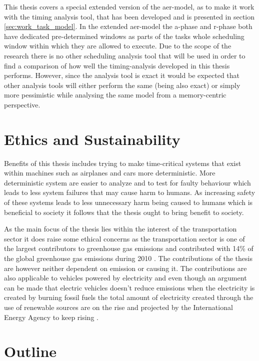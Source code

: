 \documentclass{kththesis}
\begin{document}
This thesis covers a special extended version of the \acrshort{aer}-model, as to make it work
with the timing analysis tool, that has been developed and is presented in section
\ref{sec:work_task_model}. In the extended \acrshort{aer}-model the \acrshort{a}-phase and \acrshort{r}-phase both have dedicated
pre-determined windows as parts of the tasks whole scheduling window within which they are allowed
to execute. Due to the scope of the research there is no other scheduling analysis tool that
will be used in order to find a comparison of how well the timing-analysis developed in this thesis
performs. However, since the analysis tool is exact it would be expected that other analysis tools
will either perform the same (being also exact) or simply more pessimistic while analysing the same
model from a memory-centric perspective.


\section{Ethics and Sustainability}
Benefits of this thesis includes trying to make time-critical systems that exist within machines such
as airplanes and cars more deterministic. More deterministic system are easier to analyze and to test
for faulty behaviour which leads to less system failures that may cause harm to humans. As
increasing safety of these systems leads to less unnecessary harm being caused to humans which is
beneficial to society it follows that the thesis ought to bring benefit to society.

As the main focus of the thesis lies within the interest of the transportation sector it does raise
some ethical concerns as the transportation sector is one of the largest contributors to greenhouse
gas emissions and contributed with 14\% of the global greenhouse gas emissions during 2010
\parencite{us_epa_global_2016}. The contributions of the thesis are however neither dependent on
emission or causing it. The contributions are also applicable to vehicles powered by electricity and
even though an argument can be made that electric vehicles doesn't reduce emissions when the
electricity is created by burning fossil fuels the total amount of electricity created through the
use of renewable sources are on the rise and projected by the International Energy Agency to keep
rising \parencite{fatih_renewables_nodate}.




\section{Outline}
\end{document}
